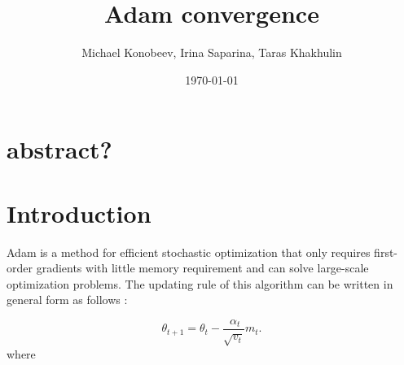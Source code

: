 \documentclass[12pt,a4paper,titlepage,fleqn]{article}
\title{Adam convergence}
\author{Michael Konobeev,
Irina Saparina,
Taras Khakhulin}
\date{\today}
\begin{document}
\maketitle

\section{abstract?}

\section{Introduction}

Adam is a method for efficient stochastic optimization that only requires first-order gradients with little memory requirement and can solve large-scale optimization problems. The updating rule of this algorithm can be written in general form as follows \cite{DBLP:journals/corr/KingmaB14}:

\begin{equation}\label{update}
\theta_{t+1} = \theta_t -  \frac{~\alpha_t}{\sqrt{v_t}}m_t.
\end{equation}
 where
 
\end{document}
